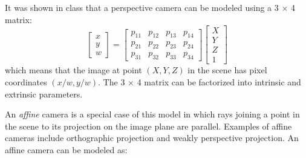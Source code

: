 It was shown in class that a perspective camera can be modeled using a 3 $\times$ 4 matrix:
\begin{equation}
\left [
\begin{matrix}
x \\
y \\
w
\end{matrix}
\right ] = \left [
\begin{matrix}
p_{11} & p_{12} & p_{13} & p_{14} \\
p_{21} & p_{22} & p_{23} & p_{24} \\
p_{31} & p_{32} & p_{33} & p_{34}
\end{matrix}
\right ] \left [
\begin{matrix}
X \\
Y \\
Z \\
1
\end{matrix}
\right ]
\end{equation}
which means that the image at point $(X, Y , Z )$ in the scene has pixel coordinates $(x/w, y/w)$. The 3 $\times$ 4 matrix can be factorized into intrinsic and extrinsic parameters.

An \emph{affine} camera is a special case of this model in which rays joining a point in the scene to its projection on the image plane are parallel. Examples of affine cameras include orthographic projection and weakly perspective projection. An affine camera can be modeled as:

